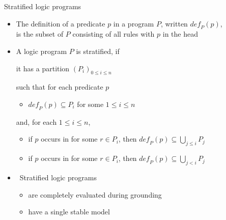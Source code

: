 \begin{frame}{Stratified logic programs}
  \bigskip
  \begin{itemize}
  \item<only@2-5> The \alert{definition} of a predicate $p$ in a program $P$, written $\mathit{def}_P(p)$,
    \\
    is the subset of $P$ consisting of all rules with $p$ in the head
    \medskip
  \item<3-> A logic program $P$ is \alert{stratified}, if
    {it has a partition
    \(
    (P_i)_{0\leq i\leq n}
    \)

    such that for each predicate $p$
    \begin{itemize}\normalsize
    \item $\mathit{def}_P(p)\subseteq P_i$ for some $1\leq i\leq n$
    \end{itemize}
    and, for each $1\leq i\leq n$,
    \begin{itemize}\normalsize
    \item if $p$ occurs in  for some $r\in P_i$, then $\mathit{def}_P(p)\subseteq\bigcup_{j\leq i} P_j$
    \item if $p$ occurs in  for some $r\in P_i$, then $\mathit{def}_P(p)\subseteq\bigcup_{j  <  i} P_j$
    \end{itemize}}
  \medskip
  \item<4->  \
    Stratified logic programs
    \begin{itemize}\normalsize
    \item are \alert{completely evaluated} during grounding
    \item <5-> have a single stable model
    \end{itemize}
  \end{itemize}
\end{frame}
%
